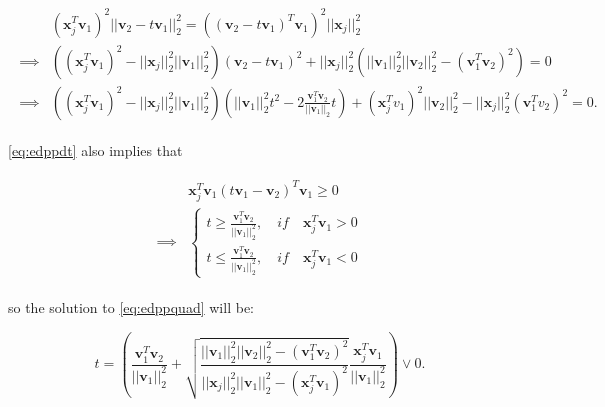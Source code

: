 \begin{gather}
    \begin{aligned}
        \label{eq:edppquad}
        &(\boldsymbol x_j^T \boldsymbol v_1)^2||\boldsymbol v_2-t\boldsymbol v_1||_2^2=\left((\boldsymbol v_2-t\boldsymbol v_1)^T \boldsymbol v_1\right)^2||\boldsymbol x_j||_2^2\\
        \implies&\left((\boldsymbol x_j^T\boldsymbol v_1)^2-||\boldsymbol x_j||_2^2||\boldsymbol v_1||_2^2\right)(\boldsymbol v_2-t\boldsymbol v_1)^2+||\boldsymbol x_j||_2^2\left(||\boldsymbol v_1||_2^2||\boldsymbol v_2||_2^2-(\boldsymbol v_1^T\boldsymbol v_2)^2\right)=0\\
        \implies&\left((\boldsymbol x_j^T\boldsymbol v_1)^2-||\boldsymbol x_j||_2^2||\boldsymbol v_1||_2^2\right)\left(||\boldsymbol v_1||_2^2t^2-2\frac{\boldsymbol v_1^T \boldsymbol v_2}{||\boldsymbol v_1||_2}t\right)+(\boldsymbol x_j^T v_1)^2||\boldsymbol v_2||_2^2-||\boldsymbol x_j||_2^2(\boldsymbol v_1^Tv_2)^2=0.
    \end{aligned}
\end{gather}

\eqref{eq:edppdt} also implies that

\begin{gather}
    \begin{aligned}
        &\boldsymbol x_j^T\boldsymbol v_1(t\boldsymbol v_1-\boldsymbol v_2)^T\boldsymbol v_1\geq 0\\
        \implies&\begin{cases}
        t\geq\frac{\boldsymbol v_1^T\boldsymbol v_2}{||\boldsymbol v_1||_2^2},\quad \textit{if}\quad\boldsymbol x_j^T\boldsymbol v_1>0\\
        t\leq\frac{\boldsymbol v_1^T\boldsymbol v_2}{||\boldsymbol v_1||_2^2},\quad \textit{if}\quad\boldsymbol x_j^T\boldsymbol v_1<0
        \end{cases}
    \end{aligned}
\end{gather}

so the solution to \eqref{eq:edppquad} will be:

\begin{equation}
    t=\left(\frac{\boldsymbol v_1^T\boldsymbol v_2}{||\boldsymbol v_1||_2^2}+\sqrt{\frac{||\boldsymbol v_1||_2^2||\boldsymbol v_2||_2^2-(\boldsymbol v_1^T\boldsymbol v_2)^2}{||\boldsymbol x_j||_2^2||\boldsymbol v_1||_2^2-(\boldsymbol x_j^T\boldsymbol v_1)^2}}\frac{\boldsymbol x_j^T\boldsymbol v_1}{||\boldsymbol v_1||_2^2}\right)\vee 0.
\end{equation}



